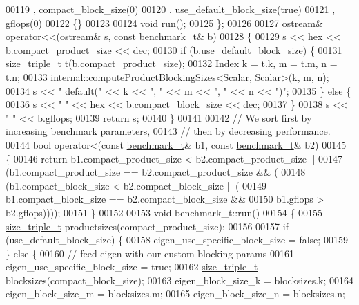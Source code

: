 \begin{DoxyCode}
00119     , compact\_block\_size(0)
00120     , use\_default\_block\_size(\textcolor{keyword}{true})
00121     , gflops(0)
00122   \{\}
00123 
00124   \textcolor{keywordtype}{void} run();
00125 \};
00126 
00127 ostream& operator<<(ostream& s, \textcolor{keyword}{const} \hyperlink{structbenchmark__t}{benchmark\_t}& b)
00128 \{
00129   s << hex << b.compact\_product\_size << dec;
00130   \textcolor{keywordflow}{if} (b.use\_default\_block\_size) \{
00131     \hyperlink{structsize__triple__t}{size\_triple\_t} t(b.compact\_product\_size);
00132     \hyperlink{namespace_eigen_a62e77e0933482dafde8fe197d9a2cfde}{Index} k = t.k, m = t.m, n = t.n;
00133     internal::computeProductBlockingSizes<Scalar, Scalar>(k, m, n);
00134     s << \textcolor{stringliteral}{" default("} << k << \textcolor{stringliteral}{", "} << m << \textcolor{stringliteral}{", "} << n << \textcolor{stringliteral}{")"};
00135   \} \textcolor{keywordflow}{else} \{
00136     s << \textcolor{stringliteral}{" "} << hex << b.compact\_block\_size << dec;
00137   \}
00138   s << \textcolor{stringliteral}{" "} << b.gflops;
00139   \textcolor{keywordflow}{return} s;
00140 \}
00141 
00142 \textcolor{comment}{// We sort first by increasing benchmark parameters,}
00143 \textcolor{comment}{// then by decreasing performance.}
00144 \textcolor{keywordtype}{bool} operator<(\textcolor{keyword}{const} \hyperlink{structbenchmark__t}{benchmark\_t}& b1, \textcolor{keyword}{const} \hyperlink{structbenchmark__t}{benchmark\_t}& b2)
00145 \{ 
00146   \textcolor{keywordflow}{return} b1.compact\_product\_size < b2.compact\_product\_size ||
00147            (b1.compact\_product\_size == b2.compact\_product\_size && (
00148              (b1.compact\_block\_size < b2.compact\_block\_size || (
00149                b1.compact\_block\_size == b2.compact\_block\_size &&
00150                  b1.gflops > b2.gflops))));
00151 \}
00152 
00153 \textcolor{keywordtype}{void} benchmark\_t::run()
00154 \{
00155   \hyperlink{structsize__triple__t}{size\_triple\_t} productsizes(compact\_product\_size);
00156 
00157   \textcolor{keywordflow}{if} (use\_default\_block\_size) \{
00158     eigen\_use\_specific\_block\_size = \textcolor{keyword}{false};
00159   \} \textcolor{keywordflow}{else} \{
00160     \textcolor{comment}{// feed eigen with our custom blocking params}
00161     eigen\_use\_specific\_block\_size = \textcolor{keyword}{true};
00162     \hyperlink{structsize__triple__t}{size\_triple\_t} blocksizes(compact\_block\_size);
00163     eigen\_block\_size\_k = blocksizes.k;
00164     eigen\_block\_size\_m = blocksizes.m;
00165     eigen\_block\_size\_n = blocksizes.n;

\end{DoxyCode}
